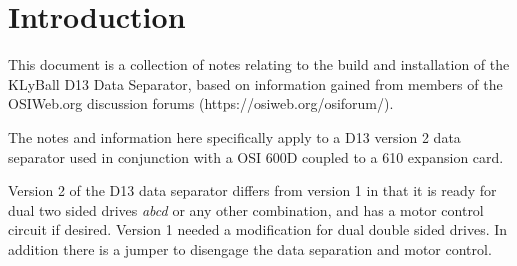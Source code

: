 \chapter{Introduction}


This document is a collection of notes relating to the build and installation of the KLyBall D13 Data Separator, based on information gained from members of the OSIWeb.org discussion forums (https://osiweb.org/osiforum/).

The notes and information here specifically apply to a D13 version 2 data separator used in conjunction with a OSI 600D coupled to a 610 expansion card.

Version 2 of the D13 data separator differs from version 1 in that it is ready for dual two sided drives \emph{abcd} or any other combination, and has a motor control circuit if desired. Version 1 needed a modification for dual double sided drives. In addition there is a jumper to disengage the data separation and motor control.
